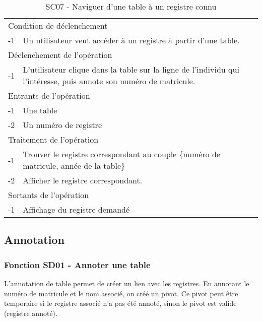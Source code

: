 \documentclass[a4paper]{article}
\begin{document}
\begin{table}[H]
  \centering
   \small
  \begin{tabular}{|c|p{12cm}|}
      \hline
        \rowcolor{lightgray}\multicolumn{2}{|c|}{\textbf{SC07 - Naviguer d'une table à un registre connu}} \\
      \hline
        \multicolumn{2}{|l|}{Condition de d\'eclenchement} \\
      \hline
      -1 & Un utilisateur veut acc\'eder \`a un registre à partir d'une table. \\
      \hline
        \multicolumn{2}{|l|}{D\'eclenchement de l'op\'eration} \\
      \hline
        -1 & L'utilisateur clique dans la table sur la ligne de l'individu qui l'intéresse, puis annote son numéro de matricule. \\
      \hline
        \multicolumn{2}{|l|}{Entrants de l'op\'eration} \\
      \hline
        -1 & Une table \\
          -2 & Un numéro de registre \\ 
      \hline
        \multicolumn{2}{|l|}{Traitement de l'op\'eration} \\
      \hline
        -1 & Trouver le registre correspondant au couple \{numéro de matricule, année de la table\} \\
          -2 & Afficher le registre correspondant. \\
      \hline
        \multicolumn{2}{|l|}{Sortants de l'op\'eration} \\
      \hline
        -1 & Affichage du registre demand\'e \\
      \hline
  \end{tabular}
  \caption{SC07 - Naviguer d'une table à un registre connu}
  \normalsize
  \label{tab:naviguer_table_registre_connu}
\end{table}
\newpage

\subsection{Annotation}



\subsubsection{Fonction SD01 - Annoter une table}


L'annotation de table permet de cr\'eer un lien avec les registres. En annotant le num\'ero de matricule et le nom associ\'e, on cr\'e\'e un pivot. Ce pivot peut \^etre temporaire si le registre associ\'e n'a pas \'et\'e annot\'e, sinon le pivot est valide (registre annot\'e).\\
\end{document}
